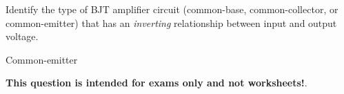 

Identify the type of BJT amplifier circuit (common-base, common-collector, or common-emitter) that has an {\it inverting} relationship between input and output voltage.







Common-emitter







{\bf This question is intended for exams only and not worksheets!}.




